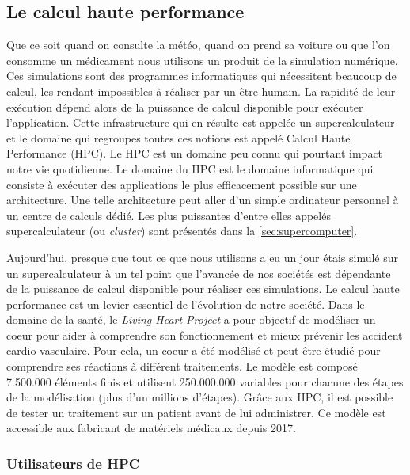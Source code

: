 \subsection{Le calcul haute performance}

    Que ce soit quand on consulte la météo, quand on prend sa voiture ou que l’on consomme un médicament nous utilisons un produit de la simulation numérique. Ces simulations sont des programmes informatiques qui nécessitent beaucoup de calcul, les rendant impossibles à réaliser par un être humain. La rapidité de leur exécution dépend alors de la puissance de calcul disponible pour exécuter l’application. Cette infrastructure qui en résulte est appelée un supercalculateur et le domaine qui regroupes toutes ces notions est appelé Calcul Haute Performance (HPC). Le HPC est un domaine peu connu qui pourtant impact notre vie quotidienne. Le domaine du HPC est le domaine informatique qui consiste à exécuter des applications le plus efficacement possible sur une architecture. Une telle architecture peut aller d'un simple ordinateur personnel à un centre de calculs dédié. Les plus puissantes d'entre elles appelés supercalculateur (ou \textit{cluster}) sont présentés dans la \autoref{sec:supercomputer}. 
    
    Aujourd’hui, presque que tout ce que nous utilisons a eu un jour étais simulé sur un supercalculateur à un tel point que l’avancée de nos sociétés est dépendante de la puissance de calcul disponible pour réaliser ces simulations. Le calcul haute performance est un levier essentiel de l'évolution de notre société. Dans le domaine de la santé, le \textit{Living Heart Project}\cite{Baillargeon2014} a pour objectif de modéliser un coeur pour aider à comprendre son fonctionnement et mieux prévenir les accident cardio vasculaire. Pour cela, un coeur a été modélisé et peut être étudié pour comprendre ses réactions à différent traitements. Le modèle est composé 7.500.000 éléments finis et utilisent 250.000.000 variables pour chacune des étapes de la modélisation (plus d'un millions d'étapes). Grâce aux HPC, il est possible de tester un traitement sur un patient avant de lui administrer. Ce modèle est accessible aux fabricant de matériels médicaux depuis 2017. 

    

   
    \subsubsection{Utilisateurs de HPC}
    
